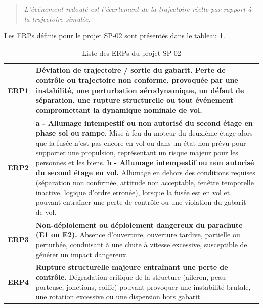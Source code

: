 \begin{quote}
    \textit{L’événement redouté est l’écartement de la trajectoire réelle par rapport à la trajectoire simulée.} ~\cite[p.~21]{CDC_BiEtage}
\end{quote}

Les \acrshort{ERPs} définis pour le projet SP-02 sont présentés dans le tableau \ref{tab:ERP_SP02}.

\begin{table}[h!]
\centering
\begin{tabular}{|c|p{12.5cm}|}
\hline
\textbf{\acrshort{ERP}1} & 
\textbf{Déviation de trajectoire / sortie du gabarit.}\newline
Perte de contrôle ou trajectoire non conforme, provoquée par une instabilité, une perturbation aérodynamique, un défaut de
séparation, une rupture structurelle ou tout événement compromettant la dynamique nominale de vol. 
\\ \hline

\textbf{\acrshort{ERP}2} & 
\textbf{a - Allumage intempestif ou non autorisé du second étage en phase sol ou rampe.}\newline
Mise à feu du moteur du deuxième étage alors que la fusée n’est pas encore en vol ou dans un état non prévu pour supporter une
propulsion, représentant un risque majeur pour les personnes et les biens. \newline\newline
\textbf{b - Allumage intempestif ou non autorisé du second étage en vol.}\newline
Allumage en dehors des conditions requises (séparation non confirmée, attitude non acceptable, fenêtre temporelle inactive,
logique d’ordre erronée), lorsque la fusée est en vol et pouvant entraîner une perte de contrôle ou une violation du gabarit
de vol.
\\ \hline

\textbf{\acrshort{ERP}3} & 
\textbf{Non-déploiement ou déploiement dangereux du parachute (E1 ou E2).}\newline
Absence d’ouverture, ouverture tardive, partielle ou perturbée, conduisant à une chute à vitesse excessive, susceptible de
générer un impact dangereux.
\\ \hline

\textbf{\acrshort{ERP}4} & 
\textbf{Rupture structurelle majeure entraînant une perte de contrôle.}\newline
Dégradation critique de la structure (aileron, peau porteuse, jonctions, coiffe) pouvant provoquer une instabilité brutale,
une rotation excessive ou une dispersion hors gabarit.
\\ \hline
\end{tabular}
\caption{Liste des \acrfull{ERPs} du projet SP-02}
\label{tab:ERP_SP02}
\end{table}

